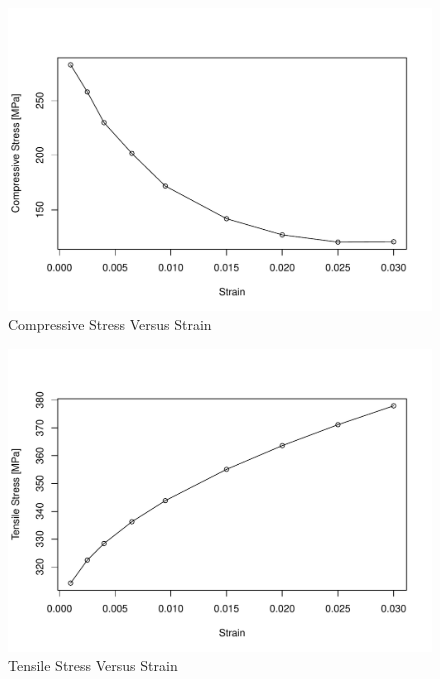 \documentclass{article}\usepackage[]{graphicx}\usepackage[]{color}
\makeatletter
\def\maxwidth{ %
  \ifdim\Gin@nat@width>\linewidth
    \linewidth
  \else
    \Gin@nat@width
  \fi
}
\newenvironment{knitrout}{}{} %
\makeatother
\begin{document}
\vspace{-.5in}

\begin{figure}[H] \vspace{-.5in} \begin{center}
\begin{knitrout}
\color{fgcolor}
\includegraphics[width=\maxwidth]{figure/plot2} 

\end{knitrout}
\end{center} \vspace{-.5in} \caption{Compressive Stress Versus Strain} \end{figure}

\vspace{-.5in}

\begin{figure}[H] \begin{center}
\begin{knitrout}
\color{fgcolor}
\includegraphics[width=\maxwidth]{figure/plot3} 

\end{knitrout}
\end{center} \vspace{-.5in} \caption{Tensile Stress Versus Strain} \end{figure}
\end{document}
